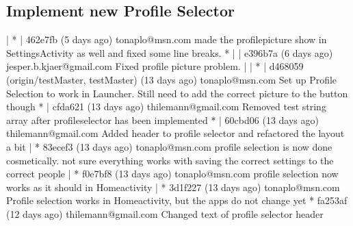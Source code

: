 \subsection{Implement new Profile Selector}\label{sec:sprint3:devprofileselector}
| * | 462e7fb (5 days ago) tonaplo@msn.com made the profilepicture show in SettingsActivity as well and fixed some line breaks.
* | | e396b7a (6 days ago) jesper.b.kjaer@gmail.com Fixed profile picture problem.
| | * | d468059 (origin/testMaster, testMaster) (13 days ago) tonaplo@msn.com Set up Profile Selection to work in Launcher. Still need to add the correct picture to the button though
* | cfda621 (13 days ago) thilemann@gmail.com Removed test string array after profileselector has been implemented
* | 60cbd06 (13 days ago) thilemann@gmail.com Added header to profile selector and refactored the layout a bit
| * 83ecef3 (13 days ago) tonaplo@msn.com profile selection is now done cosmetically. not sure everything works with saving the correct settings to the correct people
| * f0e7bf8 (13 days ago) tonaplo@msn.com profile selection now works as it should in Homeactivity
| * 3d1f227 (13 days ago) tonaplo@msn.com Profile selection works in Homeactivity, but the apps do not change yet
* fa253af (12 days ago) thilemann@gmail.com Changed text of profile selector header